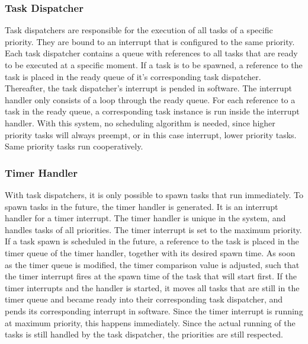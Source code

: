 \subsubsection{Task Dispatcher}
\label{sec:task_dispatcher}
Task dispatchers are responsible for the execution of all tasks of a specific priority.
They are bound to an interrupt that is configured to the same priority.
Each task dispatcher contains a queue with references to all tasks that are ready to be executed at a specific moment.
If a task is to be spawned, a reference to the task is placed in the ready queue of it's corresponding task dispatcher.
Thereafter, the task dispatcher's interrupt is pended in software. The interrupt handler only consists of a loop through the ready queue.
For each reference to a task in the ready queue, a corresponding task instance is run inside the interrupt handler.
With this system, no scheduling algorithm is needed, since higher priority tasks will always preempt, or in this case interrupt, lower priority tasks.
Same priority tasks run cooperatively.

\subsubsection{Timer Handler}
\label{sec:timer_handler}
With task dispatchers, it is only possible to spawn tasks that run immediately.
To spawn tasks in the future, the timer handler is generated. It is an interrupt handler for a timer interrupt.
The timer handler is unique in the system, and handles tasks of all priorities.
The timer interrupt is set to the maximum priority.
If a task spawn is scheduled in the future, a reference to the task is placed in the timer queue of the timer handler, together with its desired spawn time.
As soon as the timer queue is modified, the timer comparison value is adjusted, such that the timer interrupt fires at the spawn time of the task that will start first.
If the timer interrupts and the handler is started, it moves all tasks that are still in the timer queue and became ready into their corresponding task dispatcher, and pends its corresponding interrupt in software.
Since the timer interrupt is running at maximum priority, this happens immediately.
Since the actual running of the tasks is still handled by the task dispatcher, the priorities are still respected.

